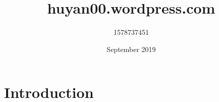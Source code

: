 \documentclass{article}
\title{huyan00.wordpress.com}
\author{1578737451 }
\date{September 2019}
\begin{document}
\maketitle

\section{Introduction}
\end{document}
